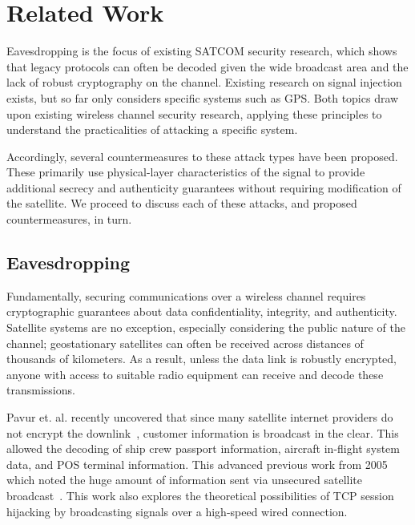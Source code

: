 \section{Related Work}


Eavesdropping is the focus of existing SATCOM security research, which shows that legacy protocols can often be decoded given the wide broadcast area and the lack of robust cryptography on the channel.
Existing research on signal injection exists, but so far only considers specific systems such as GPS.
Both topics draw upon existing wireless channel security research, applying these principles to understand the practicalities of attacking a specific system.

Accordingly, several countermeasures to these attack types have been proposed.
These primarily use physical-layer characteristics of the signal to provide additional secrecy and authenticity guarantees without requiring modification of the satellite.
We proceed to discuss each of these attacks, and proposed countermeasures, in turn.

\subsection{Eavesdropping}



Fundamentally, securing communications over a wireless channel requires cryptographic guarantees about data confidentiality, integrity, and authenticity.
Satellite systems are no exception, especially considering the public nature of the channel; geostationary satellites can often be received across distances of thousands of kilometers.
As a result, unless the data link is robustly encrypted, anyone with access to suitable radio equipment can receive and decode these transmissions.

Pavur et. al. recently uncovered that since many satellite internet providers do not encrypt the downlink~\cite{pavur2020tale}, customer information is broadcast in the clear.
This allowed the decoding of ship crew passport information, aircraft in-flight system data, and POS terminal information.
This advanced previous work from 2005 which noted the huge amount of information sent via unsecured satellite broadcast~\cite{adelsbach2005satellite}.
This work also explores the theoretical possibilities of TCP session hijacking by broadcasting signals over a high-speed wired connection.

